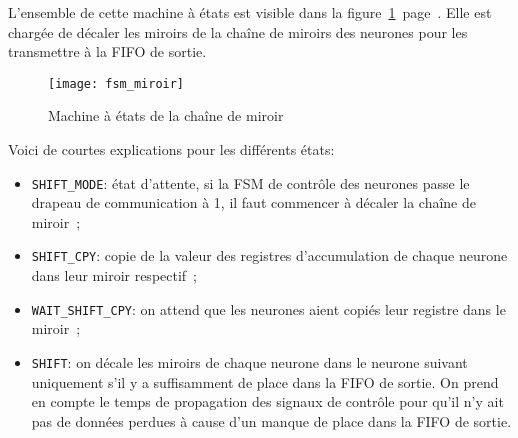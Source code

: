 L'ensemble de cette machine à états est visible dans la
figure~\ref{fig:fsm_miroir}~page~\pageref{fig:fsm_miroir}.
Elle est chargée de décaler les miroirs de la chaîne de miroirs des neurones
pour les transmettre à la FIFO de sortie.

\begin{figure}[h!]
	\texttt{[image: fsm\_miroir]}
	\caption{Machine à états de la chaîne de miroir}
	\label{fig:fsm_miroir}
\end{figure}

Voici de courtes explications pour les différents états:
\begin{itemize}
	\item \verb+SHIFT_MODE+: état d'attente, si la FSM de contrôle des neurones
		passe le drapeau de communication à 1, il faut commencer à décaler
		la chaîne de miroir~;
	\item \verb+SHIFT_CPY+: copie de la valeur des registres d'accumulation
		de chaque neurone dans leur miroir respectif~;
	\item \verb+WAIT_SHIFT_CPY+: on attend que les neurones aient copiés leur
		registre dans le miroir~;
	\item \verb+SHIFT+: on décale les miroirs de chaque neurone dans le neurone suivant
		uniquement s'il y a suffisamment de place dans la FIFO de sortie. On prend en compte
		le temps de propagation des signaux de contrôle pour qu'il n'y ait pas de données perdues
		à cause d'un manque de place dans la FIFO de sortie.
\end{itemize}


